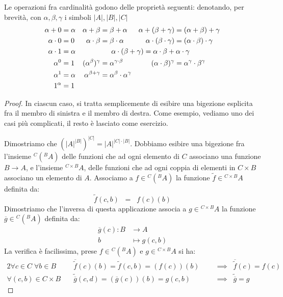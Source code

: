 \begin{proposition}
	Le operazioni fra cardinalit\`a godono delle propriet\`a seguenti: denotando, per brevit\`a, con $\alpha,\beta,\gamma$ i simboli $|A|,|B|,|C|$
	\begin{align*}
\alpha + 0 &= \alpha 	 & \alpha + \beta &= \beta + \alpha
& \alpha + (\beta + \gamma) &= (\alpha + \beta) + \gamma \\
\alpha \cdot 0 &= 0 	 & \alpha \cdot \beta &= \beta \cdot \alpha 	&
\alpha \cdot (\beta \cdot \gamma) &= (\alpha \cdot \beta) \cdot \gamma \\
\alpha \cdot 1 &= \alpha & \mathrlap{\quad\;\;\alpha \cdot (\beta + \gamma) =
\alpha \cdot \beta + \alpha \cdot \gamma} \\
\alpha^0 &= 1 		& (\alpha^\beta)^\gamma &= \alpha^{\gamma \cdot
\beta} & (\alpha \cdot \beta)^\gamma &= \alpha^\gamma \cdot \beta^\gamma \\
\alpha^1 &= \alpha	& \alpha^{\beta + \gamma} &= \alpha^\beta \cdot
\alpha^\gamma \\
1^\alpha &= 1
	\end{align*}
\end{proposition}

\begin{proof}
	In ciascun caso, si tratta semplicemente di esibire una bigezione esplicita fra il membro di sinistra e il membro di destra. Come esempio, vediamo uno dei casi pi\`u complicati, il resto 
	\`e lasciato come {\drkred esercizio}.

	Dimostriamo che $(|A|^{|B|})^{|C|} = |A|^{|C|\cdot|B|}$. Dobbiamo esibire una bigezione fra l'insieme ${}^C({}^BA)$ delle funzioni che ad ogni elemento di $C$ associano una funzione $B \rightarrow A$, e l'insieme ${}^{C \times B}A$, delle funzioni 
	che ad ogni coppia di elementi in $C \times B$ associano un elemento di $A$. Associamo a $f \in {}^C({}^BA)$ la funzione $\widetilde{f} \in {}^{C \times B}A$ definita da:
	\[ \widetilde{f}(c,b) \;\;=\;\; f(c)(b) \]
	Dimostriamo che l'inversa di questa applicazione associa a $g \in {}^{C \times B}A$ la funzione $\overline{g} \in {}^{C}({}^B A)$ definita da:
	\begin{align*}
\overline{g}(c) \colon B &\to A \\
b &\mapsto g(c,b)
\end{align*}
	La verifica \`e facilissima, prese $f\in{}^{C}({}^B A)$ e $g \in {}^{C \times B}A$ si ha:
\begin{alignat*}{2}
	\forall {c\in C}\;\forall {b \in B} \quad
&\overline{\widetilde{f}}(c)(b) = \widetilde{f}(c,b) = (f(c))(b)
&&\;\;\implies\;\; \overline{\widetilde{f}}(c) = f(c)\\
	\forall {(c,b) \in C \times B} \quad
&\widetilde{\overline{g}}(c,d) = (\overline{g}(c))(b) = g(c,b)
&&\;\;\implies\;\; \widetilde{\overline{g}} = g
\end{alignat*}
\baselineskip
\end{proof}
